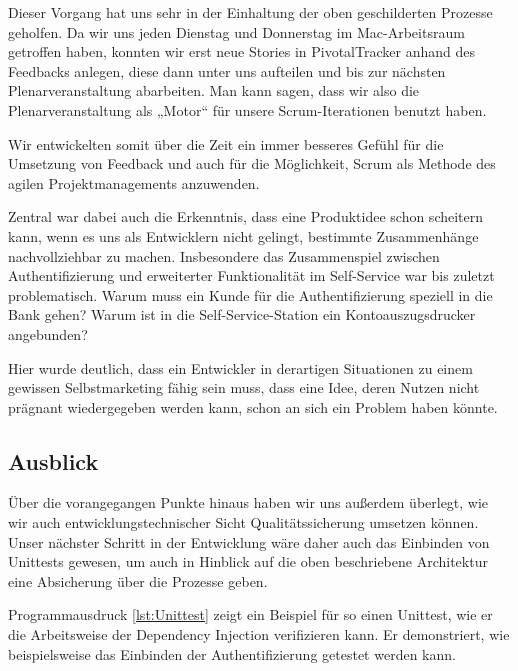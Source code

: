 	Dieser Vorgang hat uns sehr in der Einhaltung der oben geschilderten Prozesse geholfen. Da wir uns jeden Dienstag und Donnerstag im Mac-Arbeitsraum getroffen haben, konnten wir erst neue Stories in PivotalTracker anhand des Feedbacks anlegen, diese dann unter uns aufteilen und bis zur nächsten Plenarveranstaltung abarbeiten. Man kann sagen, dass wir also die Plenarveranstaltung als „Motor“ für unsere Scrum-Iterationen benutzt haben.
	
	Wir entwickelten somit über die Zeit ein immer besseres Gefühl für die Umsetzung von Feedback und auch für die Möglichkeit, Scrum als Methode des agilen Projektmanagements anzuwenden. 
	
	Zentral war dabei auch die Erkenntnis, dass eine Produktidee schon scheitern kann, wenn es uns als Entwicklern nicht gelingt, bestimmte Zusammenhänge nachvollziehbar zu machen. Insbesondere das Zusammenspiel zwischen Authentifizierung und erweiterter Funktionalität im Self-Service war bis zuletzt problematisch. Warum muss ein Kunde für die Authentifizierung speziell in die Bank gehen? Warum ist in die Self-Service-Station ein Kontoauszugsdrucker angebunden? 
	
	Hier wurde deutlich, dass ein Entwickler in derartigen Situationen zu einem gewissen Selbstmarketing fähig sein muss, dass eine Idee, deren Nutzen nicht prägnant wiedergegeben werden kann, schon an sich ein Problem haben könnte.

\subsection{Ausblick\label{sec:QMAusblick}}
	Über die vorangegangen Punkte hinaus haben wir uns außerdem überlegt, wie wir auch entwicklungstechnischer Sicht Qualitätssicherung umsetzen können. Unser nächster Schritt in der Entwicklung wäre daher auch das Einbinden von Unittests gewesen, um auch in Hinblick auf die oben beschriebene Architektur eine Absicherung über die Prozesse geben.
	
	Programmausdruck \ref{lst:Unittest} zeigt ein Beispiel für so einen Unittest, wie er die Arbeitsweise der Dependency Injection verifizieren kann. Er demonstriert, wie beispielsweise das Einbinden der Authentifizierung getestet werden kann.
	
	